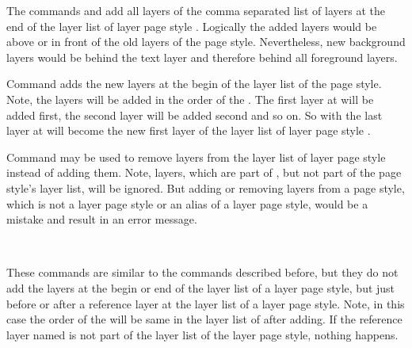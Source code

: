 The commands  and 
add all layers of the comma separated list of layers  at
the end of the layer list of layer page style . Logically the added layers would be above or in front of the old
layers of the page style. Nevertheless, new background layers would be behind
the text layer and therefore behind all foreground layers.

Command  adds the new layers at the begin
of the layer list of the page style. Note, the layers
will be added in the order of the . The first layer at
 will be added first, the second layer will be added second
and so on. So with  the last layer at
 will become the new first layer of the layer list of layer
page style .

Command  may be used to remove layers from
the layer list of layer page style  instead of adding
them. Note, layers, which are part of , but not part of
the page style's layer list, will be ignored. But adding or removing layers
from a page style, which is not a layer page style or an alias of a layer page
style, would be a mistake and result in an error message.%
%
%
%

\begin{Declaration}
  \\
\end{Declaration}
%
%
These commands are similar to the commands described before, but they do not
add the layers at the begin or end of the layer list of a layer page style,
but just before or after a reference layer at the layer list of a layer page
style. Note, in this case the order of the  will be
same in the layer list of  after adding. If the
reference layer named  is not part of the layer
list of the layer page style, nothing happens.%
%

